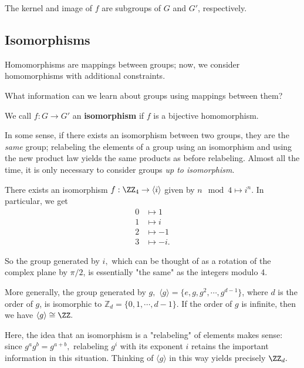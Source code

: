 The kernel and image of $f$ are subgroups of $G$ and $G'$, respectively. 

\subsection{Isomorphisms}

Homomorphisms are mappings between groups; now, we consider homomorphisms with additional constraints.
\begin{qq}
What information can we learn about groups using mappings between them?
\end{qq}
\begin{definition}
We call $f: G \rightarrow G'$ an \textbf{isomorphism} if $f$ is a bijective homomorphism. 
\end{definition}

In some sense, if there exists an isomorphism between two groups, they are the \emph{same} group; relabeling the elements of a group using an isomorphism and using the new product law yields the same products as before relabeling. Almost all the time, it is only necessary to consider groups \emph{up to isomorphism}.
\begin{example}
There exists an isomorphism $f: \ZZ_4 \rightarrow \langle i \rangle$ given by $n \mod 4 \mapsto i^n.$ In particular, we get 
\begin{align*}
    0 &\mapsto 1 \\
    1 &\mapsto i \\
    2 &\mapsto -1 \\
    3 &\mapsto -i.
\end{align*}
\end{example}

So the group generated by $i,$ which can be thought of as a rotation of the complex plane by $\pi/2$, is essentially "the same" as the integers modulo 4. 

\begin{example}
More generally, the group generated by $g, $ $\langle g \rangle = \{e, g,  g^2, \cdots, g^{d-1}\}$, where $d$ is the order of $g$, is isomorphic to $\mathbb{Z}_d = \{0, 1, \cdots, d-1\}.$ If the order of $g$ is infinite, then we have $\langle g\rangle \cong \ZZ.$
\end{example}

Here, the idea that an isomorphism is a "relabeling" of elements makes sense: since $g^{a}g^{b} = g^{a + b},$ relabeling $g^i$ with its exponent $i$ retains the important information in this situation. Thinking of $\langle g \rangle$ in this way yields precisely $\ZZ_d.$ 

